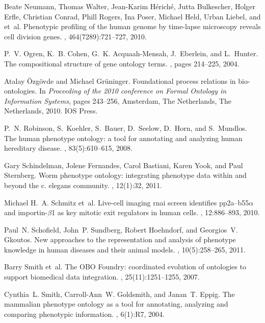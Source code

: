 \documentclass{bioinfo}
\begin{document}
\begin{thebibliography}{10}
Beate Neumann, Thomas Walter, Jean-Karim Hériché, Jutta Bulkescher, Holger
  Erfle, Christian Conrad, Phill Rogers, Ina Poser, Michael Held, Urban Liebel,
  and et~al.
\newblock Phenotypic profiling of the human genome by time-lapse microscopy
  reveals cell division genes.
, 464(7289):721--727, 2010.

P.~V. Ogren, K.~B. Cohen, G.~K. Acquaah-Mensah, J.~Eberlein, and L.~Hunter.
\newblock The compositional structure of gene ontology terms.
, pages 214--225, 2004.

Atalay \"{O}zg\"{o}vde and Michael Gr\"{u}ninger.
\newblock Foundational process relations in bio-ontologies.
\newblock In {\em Proceeding of the 2010 conference on Formal Ontology in
  Information Systems}, pages 243--256, Amsterdam, The Netherlands, The
  Netherlands, 2010. IOS Press.

P.~N. Robinson, S.~Koehler, S.~Bauer, D.~Seelow, D.~Horn, and S.~Mundlos.
\newblock The human phenotype ontology: a tool for annotating and analyzing
  human hereditary disease.
, 83(5):610--615, 2008.

Gary Schindelman, Jolene Fernandes, Carol Bastiani, Karen Yook, and Paul
  Sternberg.
\newblock Worm phenotype ontology: integrating phenotype data within and beyond
  the c. elegans community.
, 12(1):32, 2011.

Michael H.~A. Schmitz et~al.
\newblock Live-cell imaging rnai screen identifies pp2a–b55$\alpha$ and
  importin-$\beta$1 as key mitotic exit regulators in human cells.
, 12:886--893, 2010.

Paul~N. Schofield, John~P. Sundberg, Robert Hoehndorf, and Georgios~V. Gkoutos.
\newblock New approaches to the representation and analysis of phenotype
  knowledge in human diseases and their animal models.
, 10(5):258--265, 2011.

Barry Smith et~al.
\newblock The {OBO} {F}oundry: coordinated evolution of ontologies to support
  biomedical data integration.
, 25(11):1251--1255, 2007.

Cynthia~L. Smith, Carroll-Ann~W. Goldsmith, and Janan~T. Eppig.
\newblock The mammalian phenotype ontology as a tool for annotating, analyzing
  and comparing phenotypic information.
, 6(1):R7, 2004.

\end{thebibliography}

% 
\end{document}
